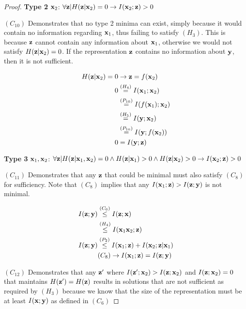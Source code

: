 \begin{theorem}
\begin{proof}
\textbf{Type 2} ${\mathbf{x}}_2$: $\forall {\mathbf{z}}|H({\mathbf{z}}| {\mathbf{x}}_2)=0 \rightarrow I({\mathbf{x}}_2; {\mathbf{z}}) > 0$

$(C_{10})$ Demonstrates that no type 2 minima can exist, simply because it would contain no information regarding ${\mathbf{x}}_1$, thus failing to satisfy $(H_3)$. This is because ${\mathbf{z}}$ cannot contain any information about ${\mathbf{x}}_1$, otherwise we would not satisfy $H({\mathbf{z}}|{\mathbf{x}}_2)=0$. If the representation ${\mathbf{z}}$ contains no information about ${\mathbf{y}}$, then it is not sufficient.

$$
\begin{aligned}
H({\mathbf{z}}| {\mathbf{x}}_2) = 0 & \rightarrow {\mathbf{z}} = f({\mathbf{x}}_2) \\
0 &\stackrel{\left(H_4\right)}{=} I({\mathbf{x}}_1; {\mathbf{x}}_2)\\
&\stackrel{\left(P_{10}\right)}{=} I(f({\mathbf{x}}_1);{\mathbf{x}}_2)\\
&\stackrel{\left(H_5\right)}{=} I({\mathbf{y}}; {\mathbf{x}}_2)\\
&\stackrel{\left(P_{10}\right)}{=} I({\mathbf{y}};f({\mathbf{x}}_2))\\
0&=I({\mathbf{y}};{\mathbf{z}})
\end{aligned}
$$

\textbf{Type 3} ${\mathbf{x}}_1, {\mathbf{x}}_2$: $\forall {\mathbf{z}}|H({\mathbf{z}}| {\mathbf{x}}_1 , {\mathbf{x}}_2)=0 \land H({\mathbf{z}}|{\mathbf{x}}_1)>0 \land H({\mathbf{z}}| {\mathbf{x}}_2)>0 \rightarrow I({\mathbf{x}}_2; {\mathbf{z}}) > 0$

$(C_{11})$ Demonstrates that any ${\mathbf{z}}$ that could be minimal must also satisfy $(C_8)$ for sufficiency. Note that $(C_8)$ implies that any $I({\mathbf{x}}_1; {\mathbf{z}}) >  I({\mathbf{z}};{\mathbf{y}})$ is not minimal.

$$
\begin{aligned}
I({\mathbf{z}}; {\mathbf{y}})&\stackrel{\left(C_6\right)}{\leq} I({\mathbf{z}}; {\mathbf{x}})  \\
&\stackrel{\left(H_4\right)}{\leq}  I({\mathbf{x}}_1 {\mathbf{x}}_2; {\mathbf{z}}) \\
I({\mathbf{z}}; {\mathbf{y}}) &\stackrel{\left(P_2\right)}{\leq} I({\mathbf{x}}_1; {\mathbf{z}}) + I({\mathbf{x}}_2; {\mathbf{z}}| {\mathbf{x}}_1) \\
& (C_8) \rightarrow I({\mathbf{x}}_1; {\mathbf{z}}) =  I({\mathbf{z}}; {\mathbf{y}}) \\
\end{aligned}
$$

$(C_{12})$ Demonstrates that any ${\mathbf{z}}'$ where $I({\mathbf{z}}'; {\mathbf{x}}_2)>I({\mathbf{z}}; {\mathbf{x}}_2)$ and $I({\mathbf{z}}; {\mathbf{x}}_2) = 0$ that maintains $H({\mathbf{z}}') = H({\mathbf{z}})$ results in  solutions that are not sufficient as required by $(H_3)$ because we know that the size of the representation must be at least $I({\mathbf{x}}; {\mathbf{y}})$ as defined in $(C_6)$


\end{proof}
\end{theorem}
